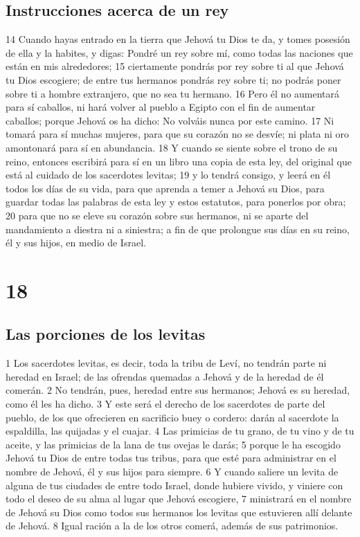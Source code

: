 \section{Instrucciones acerca de un rey}

14 Cuando hayas entrado en la tierra que Jehová tu Dios te da, y tomes posesión de ella y la habites, y digas: Pondré un rey sobre mí, como todas las naciones que están en mis alrededores;
15 ciertamente pondrás por rey sobre ti al que Jehová tu Dios escogiere; de entre tus hermanos pondrás rey sobre ti; no podrás poner sobre ti a hombre extranjero, que no sea tu hermano.
16 Pero él no aumentará para sí caballos, ni hará volver al pueblo a Egipto con el fin de aumentar caballos; porque Jehová os ha dicho: No volváis nunca por este camino.
17 Ni tomará para sí muchas mujeres, para que su corazón no se desvíe; ni plata ni oro amontonará para sí en abundancia. 
18 Y cuando se siente sobre el trono de su reino, entonces escribirá para sí en un libro una copia de esta ley, del original que está al cuidado de los sacerdotes levitas;
19 y lo tendrá consigo, y leerá en él todos los días de su vida, para que aprenda a temer a Jehová su Dios, para guardar todas las palabras de esta ley y estos estatutos, para ponerlos por obra;
20 para que no se eleve su corazón sobre sus hermanos, ni se aparte del mandamiento a diestra ni a siniestra; a fin de que prolongue sus días en su reino, él y sus hijos, en medio de Israel. 


\chapter{18}


\section{Las porciones de los levitas}


1 Los sacerdotes levitas, es decir, toda la tribu de Leví, no tendrán parte ni heredad en Israel; de las ofrendas quemadas a Jehová y de la heredad de él comerán.
2 No tendrán, pues, heredad entre sus hermanos; Jehová es su heredad, como él les ha dicho. 
3 Y este será el derecho de los sacerdotes de parte del pueblo, de los que ofrecieren en sacrificio buey o cordero: darán al sacerdote la espaldilla, las quijadas y el cuajar.
4 Las primicias de tu grano, de tu vino y de tu aceite, y las primicias de la lana de tus ovejas le darás;
5 porque le ha escogido Jehová tu Dios de entre todas tus tribus, para que esté para administrar en el nombre de Jehová, él y sus hijos para siempre.
6 Y cuando saliere un levita de alguna de tus ciudades de entre todo Israel, donde hubiere vivido, y viniere con todo el deseo de su alma al lugar que Jehová escogiere,
7 ministrará en el nombre de Jehová su Dios como todos sus hermanos los levitas que estuvieren allí delante de Jehová.
8 Igual ración a la de los otros comerá, además de sus patrimonios.

